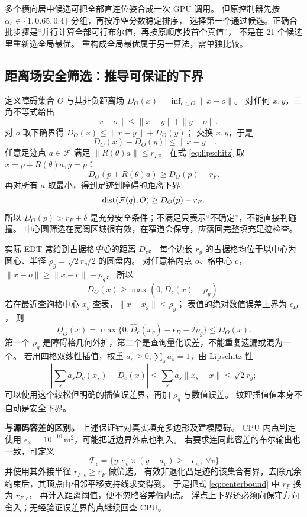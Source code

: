 多个横向居中候选可把全部直连位姿合成一次 GPU 调用。
但原控制器先按 $\alpha_c\in\{1,0.65,0.4\}$ 分组，再按净空分数稳定排序，
选择第一个通过候选。正确合批步骤是“并行计算全部可行布尔值，再按原顺序找首个真值”，
不是在 21 个候选里重新选全局最优。
重构成全局最优属于另一算法，需单独比较。

\subsection{距离场安全筛选：推导可保证的下界}
定义障碍集合 $O$ 与其非负距离场
$D_O(x)=\inf_{o\in O}\|x-o\|$。
对任何 $x,y$，三角不等式给出
\[
\|x-o\|\le\|x-y\|+\|y-o\|.
\]
对 $o$ 取下确界得 $D_O(x)\le\|x-y\|+D_O(y)$；
交换 $x,y$，于是
\begin{equation}
|D_O(x)-D_O(y)|\le\|x-y\|.
\label{eq:lipschitz}
\end{equation}
任意足迹点 $a\in\mathcal F$ 满足 $\|R(\theta)a\|\le r_F$。
在式 \eqref{eq:lipschitz} 取 $x=p+R(\theta)a,y=p$：
\[
D_O(p+R(\theta)a)\ge D_O(p)-r_F.
\]
再对所有 $a$ 取最小，得到足迹到障碍的距离下界
\begin{equation}
\operatorname{dist}(\mathcal F(q),O)\ge D_O(p)-r_F.
\label{eq:centerbound}
\end{equation}
所以 $D_O(p)>r_F+\delta$ 是充分安全条件；不满足只表示“不确定”，不能直接判碰撞。
中心圆筛选在宽阔区域很有效，在窄道会保守，应落回完整填充足迹检查。

实际 EDT 常给到占据格\emph{中心}的距离 $D_c$。
每个边长 $r_g$ 的占据格均位于以中心为圆心、半径 $\rho_g=\sqrt2r_g/2$ 的圆盘内。
对任意格内点 $o$、格中心 $c$，
$\|x-o\|\ge\|x-c\|-\rho_g$，
所以
\begin{equation}
D_O(x)\ge\max(0,D_c(x)-\rho_g).
\end{equation}
若在最近查询格中心 $x_g$ 查表，$\|x-x_g\|\le\rho_g$；
表值的绝对数值误差上界为 $\epsilon_D$，
则
\begin{equation}
\underline D_O(x)=
\max\{0,\widehat D_c(x_g)-\epsilon_D-2\rho_g\}\le D_O(x).
\label{eq:edtbound}
\end{equation}
第一个 $\rho_g$ 是障碍格几何外扩，第二个是查询量化误差，不能重复遗漏或混为一个。
若用四格双线性插值，权重 $a_s\ge0,\sum_s a_s=1$，由 Lipschitz 性
\[
\left|\sum_s a_sD_c(x_s)-D_c(x)\right|
\le\sum_s a_s\|x_s-x\|\le\sqrt2r_g;
\]
可以使用这个较松但明确的插值误差界，再加 $\rho_g$ 与数值误差。
纹理插值值本身不自动是安全下界。

\textbf{与源码容差的区别。}
上述保证针对真实填充多边形及建模障碍。
CPU 内点判定使用 $\epsilon_\times=10^{-10}\,\mathrm m^2$，可能把近边界外点也判入。
若要求连同此容差的布尔输出也一致，可定义
\[
\mathcal F_\epsilon=\{y:e_v\times(y-a_v)\ge-\epsilon_\times,\ \forall v\}
\]
并使用其外接半径 $r_{F,\epsilon}\ge r_F$ 做筛选。
有效非退化凸足迹的该集合有界，去除冗余约束后，其顶点由相邻平移支持线求交得到。
于是把式 \eqref{eq:centerbound} 中 $r_F$ 换为 $r_{F,\epsilon}$，
再计入距离阈值，便不忽略容差假内点。
浮点上下界还必须向保守方向舍入；无经验证误差界的点继续回查 CPU。

